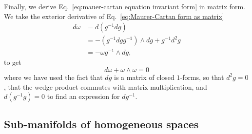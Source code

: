 Finally, we derive Eq.~\ref{eq:mauer-cartan equation invariant form} in matrix form. We take the exterior derivative of Eq.~\ref{eq:Maurer-Cartan form as matrix}
\begin{equation} \label{eq:Mauer-Cartan equation in matrix form}
\begin{aligned}
d \omega & = d(g^{-1} dg) \\
& = - (g^{-1} dg g^{-1}) \wedge dg + g^{-1} d^2 g \\
& = - \omega g^{-1} \wedge dg,
\end{aligned}
\end{equation}
to get
\begin{equation}
d \omega + \omega \wedge \omega = 0
\end{equation}
where we have used the fact that $dg$ is a matrix of closed $1$-forms, so that $d^2 g=0$, that the wedge product commutes with matrix multiplication, and $d(g^{-1} g) = 0$ to find an expression for $d g^{-1}$.

\subsection{Sub-manifolds of homogeneous spaces} \label{sec:Sub-manifolds of homogeneous spaces}

